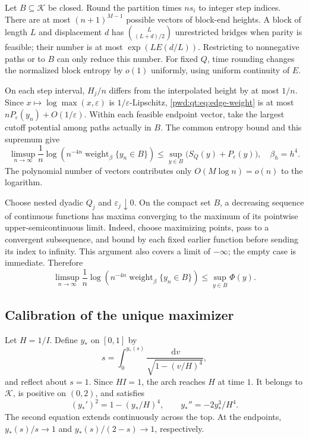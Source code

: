 \documentclass[11pt,letterpaper]{article}
\numberwithin{equation}{section}
\theoremstyle{remark}\newtheorem{remark}[theorem]{Remark}
\newcommand{\K}{\mathcal K}\newcommand{\ee}{\mathrm e}\newcommand{\dd}{\,\mathrm d}
\begin{document}
Let $B\subseteq\K$ be closed. Round the partition times $ns_i$ to integer step indices. There are at most $(n+1)^{M-1}$ possible vectors of block-end heights. A block of length $L$ and displacement $d$ has $\binom{L}{(L+d)/2}$ unrestricted bridges when parity is feasible; their number is at most $\exp(LE(d/L))$. Restricting to nonnegative paths or to $B$ can only reduce this number. For fixed $Q$, time rounding changes the normalized block entropy by $o(1)$ uniformly, using uniform continuity of $E$.

On each step interval, $H_j/n$ differs from the interpolated height by at most $1/n$. Since $x\mapsto\log\max(x,\varepsilon)$ is $1/\varepsilon$-Lipschitz, \eqref{pwd:qt:eq:edge-weight} is at most $nP_\varepsilon(y_n)+O(1/\varepsilon)$. Within each feasible endpoint vector, take the largest cutoff potential among paths actually in $B$. The common entropy bound and this supremum give
\begin{equation}\label{pwd:qt:eq:upper-fixed}
 \limsup_{n\to\infty}\frac1n\log\left(n^{-4n}
    \operatorname{weight}_{\beta}\{y_n\in B\}\right)
 \le\sup_{y\in B}\bigl(S_Q(y)+P_\varepsilon(y)\bigr),
 \quad\beta_h=h^4.
\end{equation}
The polynomial number of vectors contributes only $O(M\log n)=o(n)$ to the logarithm.

Choose nested dyadic $Q_j$ and $\varepsilon_j\downarrow0$. On the compact set $B$, a decreasing sequence of continuous functions has maxima converging to the maximum of its pointwise upper-semicontinuous limit. Indeed, choose maximizing points, pass to a convergent subsequence, and bound by each fixed earlier function before sending its index to infinity. This argument also covers a limit of $-\infty$; the empty case is immediate. Therefore
\begin{equation}\label{pwd:qt:eq:upper}
 \limsup_{n\to\infty}\frac1n\log\left(n^{-4n}
    \operatorname{weight}_{\beta}\{y_n\in B\}\right)
 \le\sup_{y\in B}\Phi(y).
\end{equation}

\subsection{Calibration of the unique maximizer}
Let $H=1/I$. Define $y_*$ on $[0,1]$ by
\begin{equation}\label{pwd:qt:eq:arch}
 s=\int_0^{y_*(s)}\frac{\dd v}{\sqrt{1-(v/H)^4}},
\end{equation}
and reflect about $s=1$. Since $HI=1$, the arch reaches $H$ at time $1$. It belongs to $\K$, is positive on $(0,2)$, and satisfies
\begin{equation}\label{pwd:qt:eq:shape-ode}
 (y_*')^2=1-(y_*/H)^4,\qquad y_*''=-2y_*^3/H^4.
\end{equation}
The second equation extends continuously across the top. At the endpoints, $y_*(s)/s\to1$ and $y_*(s)/(2-s)\to1$, respectively.
\end{document}
